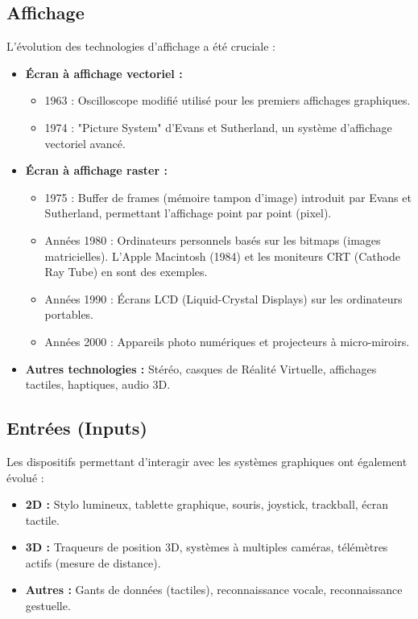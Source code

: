 \documentclass{article}
\begin{document}
\subsection{Affichage}
L'évolution des technologies d'affichage a été cruciale :
\begin{itemize}
    \item \textbf{Écran à affichage vectoriel :}
    \begin{itemize}
        \item 1963 : Oscilloscope modifié utilisé pour les premiers affichages graphiques.
        \item 1974 : "Picture System" d'Evans et Sutherland, un système d'affichage vectoriel avancé.
    \end{itemize}
    \item \textbf{Écran à affichage raster :}
    \begin{itemize}
        \item 1975 : Buffer de frames (mémoire tampon d'image) introduit par Evans et Sutherland, permettant l'affichage point par point (pixel).
        \item Années 1980 : Ordinateurs personnels basés sur les bitmaps (images matricielles). L'Apple Macintosh (1984) et les moniteurs CRT (Cathode Ray Tube) en sont des exemples.
        \item Années 1990 : Écrans LCD (Liquid-Crystal Displays) sur les ordinateurs portables.
        \item Années 2000 : Appareils photo numériques et projecteurs à micro-miroirs.
    \end{itemize}
    \item \textbf{Autres technologies :} Stéréo, casques de Réalité Virtuelle, affichages tactiles, haptiques, audio 3D.
\end{itemize}
\subsection{Entrées (Inputs)}
Les dispositifs permettant d'interagir avec les systèmes graphiques ont également évolué :
\begin{itemize}
    \item \textbf{2D :} Stylo lumineux, tablette graphique, souris, joystick, trackball, écran tactile.
    \item \textbf{3D :} Traqueurs de position 3D, systèmes à multiples caméras, télémètres actifs (mesure de distance).
    \item \textbf{Autres :} Gants de données (tactiles), reconnaissance vocale, reconnaissance gestuelle.
\end{itemize}
\end{document}

